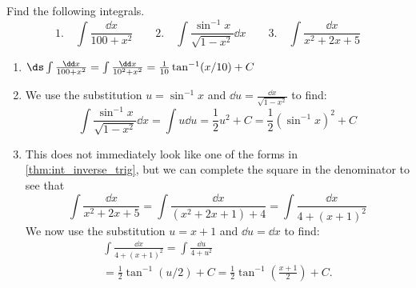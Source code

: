 \begin{example}\label{eg_inv_deriv_harder}%
Find the following integrals.
\[
 \text{1.}\quad\int\frac{\dd x}{100+x^2}\qquad
 \text{2.}\quad\int\frac{\sin^{-1} x}{\sqrt{1-x^2}}\dd x\qquad
 \text{3.}\quad\int\frac{\dd x}{x^2+2x+5}
\]
\solution
\begin{enumerate}
\item $\ds\int\frac{\dd x}{100+x^2}=\int\frac{\dd x}{10^2+x^2}=\frac1{10}\tan^{-1}(x/10)+C$
\item We use the substitution $u=\sin^{-1}x$ and $\dd u=\frac{\dd x}{\sqrt{1-x^2}}$ to find:
\[\int\frac{\sin^{-1}x}{\sqrt{1-x^2}}\dd x=\int u\dd u=\frac12 u^2+C=\frac 12\left(\sin^{-1}x\right)^2+C\]
\item This does not immediately look like one of the forms in \autoref{thm:int_inverse_trig}, but we can complete the square in the denominator to see that
\[\int\frac{\dd x}{x^2+2x+5} =\int\frac{\dd x}{(x^2+2x+1)+4}=\int\frac{\dd x}{4+(x+1)^2}\]
We now use the substitution $u=x+1$ and $\dd u=\dd x$ to find:
\begin{multline*}
 \int\frac{\dd x}{4+(x+1)^2} =\int\frac{\dd u}{4+u^2}\\
 =\frac12 \tan^{-1}(u/2)+C =\frac 12\tan^{-1}\left(\frac{x+1}2\right)+C.
\end{multline*}
\end{enumerate}
\end{example}

